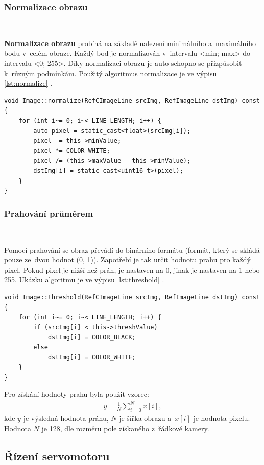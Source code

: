 \subsubsection*{Normalizace obrazu}\

\textbf{Normalizace obrazu} probíhá na základě nalezení minimálního a~maximálního
bodu v~celém obraze. Každý bod je normalizován v~intervalu <min; max> do intervalu
<0; 255>. 
Díky normalizaci obrazu je auto schopno se přizpůsobit k~různým  podmínkám. Použitý
algoritmus normalizace je ve výpisu \ref{lst:normalize} \cite{robot}.
\begin{lstlisting}[caption = Normalizace obrazu., label = lst:normalize]
void Image::normalize(RefCImageLine srcImg, RefImageLine dstImg) const {
    for (int i~= 0; i~< LINE_LENGTH; i++) {
        auto pixel = static_cast<float>(srcImg[i]);
        pixel -= this->minValue;
        pixel *= COLOR_WHITE;
        pixel /= (this->maxValue - this->minValue);
        dstImg[i] = static_cast<uint16_t>(pixel);
    }
}
\end{lstlisting}

\subsubsection*{Prahování průměrem}\

Pomocí prahování se obraz převádí do binárního formátu (formát, který se skládá
pouze ze~dvou hodnot (0, 1)). Zapotřebí je tak určit hodnotu prahu pro každý pixel.
Pokud pixel je nižší než práh, je nastaven na 0, jinak je nastaven na 1 nebo 255.
Ukázku algoritmu je ve výpisu \ref{lst:threshold} \cite{robot}.
\begin{lstlisting}[caption = Prahování průměrem., label = lst:threshold]
void Image::threshold(RefCImageLine srcImg, RefImageLine dstImg) const {
    for (int i~= 0; i~< LINE_LENGTH; i++) {
        if (srcImg[i] < this->threshValue)
            dstImg[i] = COLOR_BLACK;
        else
            dstImg[i] = COLOR_WHITE;
    }
}
\end{lstlisting}

Pro získání hodnoty prahu byla použit vzorec:
\begin{align}
y = \frac{1}{N} \sum_{i = 0}^{N}x[i],
\end{align}
kde $y$ je výsledná hodnota práhu, $N$ je šířka obrazu a~$x[i]$ je hodnota pixelu. Hodnota $N$ je 128, dle rozměru pole získaného z~řádkové kamery. 

\subsection{Řízení servomotoru}\
\label{sec:servocontrol}

